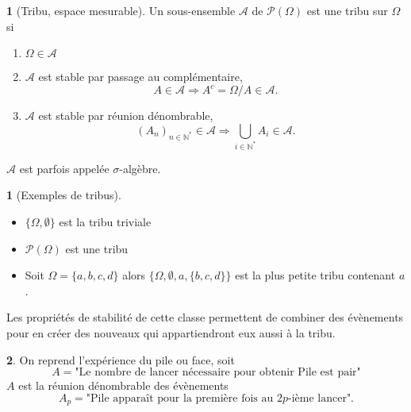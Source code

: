 \documentclass[8pt,notheorems]{beamer}
\theoremstyle{definition}
\newtheorem{definition}{\translate{Definition}}
\theoremstyle{example}
\newtheorem{example}{\translate{Exemple}}
\theoremstyle{mystyle}
\theoremstyle{plain}
\begin{document}
\begin{frame}[allowframebreaks]

\begin{definition}[Tribu, espace mesurable]
Un sous-ensemble $\mathcal{A}$ de $\mathcal{P}(\Omega)$ est une tribu sur $\Omega$ si
\begin{enumerate}
\item $\Omega\in \mathcal{A}$
\item $\mathcal{A}$ est stable par passage au complémentaire,
$$
A\in\mathcal{A}\Rightarrow A^{c}=\Omega / A \in\mathcal{A}.
$$
\item $\mathcal{A}$ est stable par réunion dénombrable,
$$
(A_n)_{n\in\mathbb{N}^\ast}\in \mathcal{A} \Rightarrow \bigcup_{i\in\mathbb{N}^\ast}A_i\in\mathcal{A}.
$$
\end{enumerate}
\end{definition}
$\mathcal{A}$ est parfois appelée $\sigma$-algèbre.
\begin{example}[Exemples de tribus]
\begin{itemize}
\item $\{\Omega,\emptyset\}$ est la tribu triviale
\item $\mathcal{P}(\Omega)$ est une tribu
\item Soit $\Omega=\{a,b,c,d\}$ alors $\{\Omega,\emptyset,a,\{b,c,d\}\}$ est la plus petite tribu contenant $a$.
\end{itemize}
\end{example}
Les propriétés de stabilité de cette classe permettent de combiner des évènements pour en créer des nouveaux qui appartiendront eux aussi à la tribu. 
\begin{example}
On reprend l'expérience du pile ou face, soit 
$$
A = \text{"Le nombre de lancer nécessaire pour obtenir Pile est pair"}
$$
$A$ est la réunion dénombrable des évènements 
$$
A_p = \text{"Pile apparaît pour la première fois au $2p$-ième lancer".}
$$
\end{example}
\end{frame}
\end{document}
